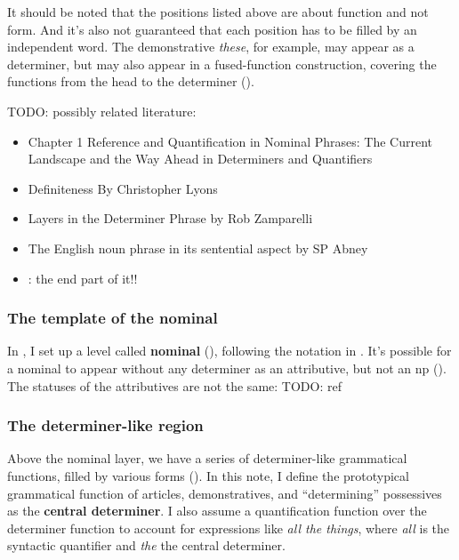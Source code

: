 \documentclass[UTF8, a4paper, oneside, scheme=plain]{ctexrep}
\newcommand*{\citepage}[1]{p.~{#1}}
\newcommand*{\concept}[1]{\textbf{#1}}
\newcommand{\corpus}[1]{\emph{#1}}
\begin{document}
It should be noted that the positions listed above are about function and not form.
And it's also not guaranteed that 
each position has to be filled by an independent word.
The demonstrative \corpus{these}, for example, 
may appear as a determiner, 
but may also appear in a fused-function construction,
covering the functions from the head to the determiner
().

TODO: possibly related literature: 
\begin{itemize}
    \item Chapter 1 Reference and Quantification in Nominal Phrases: The Current Landscape and the Way Ahead in Determiners and Quantifiers
    \item Definiteness By Christopher Lyons
    \item Layers in the Determiner Phrase by Rob Zamparelli
    \item The English noun phrase in its sentential aspect by SP Abney
    \item \citet{laenzlinger2017view}: the end part of it!!
\end{itemize}

\subsubsection{The template of the nominal}

In , 
I set up a level called \concept{nominal} (),
following the notation in \citet[\citepage{329}]{cgel}.
It's possible for a nominal to appear without any determiner
as an attributive,
but not an \acs{np} ().
The statuses of the attributives are not the same:
TODO: ref

\subsubsection{The determiner-like region}

Above the nominal layer, 
we have a series of determiner-like grammatical functions,
filled by various forms ().
In this note, 
I define the prototypical grammatical function of articles, demonstratives, 
and ``determining'' possessives as the \concept{central determiner}.
I also assume a quantification function over the determiner function
to account for expressions like \corpus{all the things},
where \corpus{all} is the syntactic quantifier and \corpus{the} the central determiner.
\end{document}
